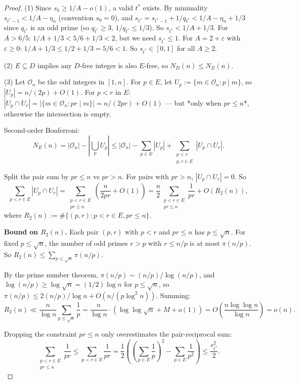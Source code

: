 \documentclass{article}
\begin{document}
\begin{proof}
(1) Since $s_k \ge 1/A - o(1)$, a valid $t^*$ exists. By minimality $s_{t^*-1} < 1/A - \eta_n$ (convention $s_0 = 0$), and $s_{t^*} = s_{t^*-1} + 1/q_{t^*} < 1/A - \eta_n + 1/3$ since $q_{t^*}$ is an odd prime (so $q_{t^*} \ge 3$, $1/q_{t^*} \le 1/3$). So $s_{t^*} < 1/A + 1/3$. For $A > 6/5$: $1/A + 1/3 < 5/6 + 1/3 < 2$, but we need $s_{t^*} \le 1$. For $A = 2 + \varepsilon$ with $\varepsilon \ge 0$: $1/A + 1/3 \le 1/2 + 1/3 = 5/6 < 1$. So $s_{t^*} \in [0, 1]$ for all $A \ge 2$.

(2) $E \subseteq D$ implies any $D$-free integer is also $E$-free, so $N_D(n) \le N_E(n)$.

(3) Let $\mathcal{O}_n$ be the odd integers in $[1, n]$. For $p \in E$, let $U_p := \{m \in \mathcal{O}_n : p \mid m\}$, so $|U_p| = n/(2p) + O(1)$. For $p < r$ in $E$: $|U_p \cap U_r| = |\{m \in \mathcal{O}_n : pr \mid m\}| = n/(2pr) + O(1)$ — but *only when $pr \le n$*, otherwise the intersection is empty.

Second-order Bonferroni:
\[
N_E(n) = |\mathcal{O}_n| - |\bigcup_p U_p| \le |\mathcal{O}_n| - \sum_{p \in E} |U_p| + \sum_{\substack{p < r \\ p, r \in E}} |U_p \cap U_r|.
\]

Split the pair sum by $pr \le n$ vs $pr > n$. For pairs with $pr > n$, $|U_p \cap U_r| = 0$. So
\[
\sum_{p < r \in E} |U_p \cap U_r| = \sum_{\substack{p < r \in E \\ pr \le n}} \left(\frac{n}{2pr} + O(1)\right) = \frac{n}{2} \sum_{\substack{p < r \in E \\ pr \le n}} \frac{1}{pr} + O(R_2(n)),
\]
where $R_2(n) := \#\{(p, r) : p < r \in E, pr \le n\}$.

\textbf{Bound on $R_2(n)$.} Each pair $(p, r)$ with $p < r$ and $pr \le n$ has $p \le \sqrt n$. For fixed $p \le \sqrt n$, the number of odd primes $r > p$ with $r \le n/p$ is at most $\pi(n/p)$. So $R_2(n) \le \sum_{p \le \sqrt n} \pi(n/p)$.

By the prime number theorem, $\pi(n/p) \sim (n/p) / \log(n/p)$, and $\log(n/p) \ge \log \sqrt n = (1/2)\log n$ for $p \le \sqrt n$, so $\pi(n/p) \le 2(n/p)/\log n + O(n/(p \log^2 n))$. Summing:
\[
R_2(n) \ll \frac{n}{\log n} \sum_{p \le \sqrt n} \frac{1}{p} = \frac{n}{\log n} \cdot (\log\log \sqrt n + M + o(1)) = O\!\left(\frac{n \log\log n}{\log n}\right) = o(n).
\]

Dropping the constraint $pr \le n$ only overestimates the pair-reciprocal sum:
\[
\sum_{\substack{p < r \in E \\ pr \le n}} \frac{1}{pr} \le \sum_{p < r \in E} \frac{1}{pr} = \frac{1}{2}\left(\left(\sum_{p \in E}\frac{1}{p}\right)^2 - \sum_{p \in E}\frac{1}{p^2}\right) \le \frac{s_{t^*}^2}{2}.
\]


\end{proof}
\end{document}
